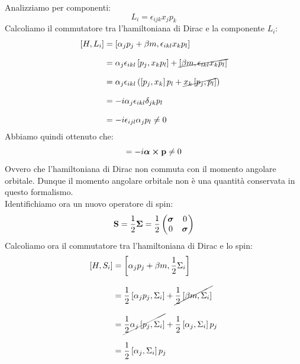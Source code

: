 Analizziamo per componenti:
\begin{equation}
  L_i = \epsilon_{ijk} x_j p_k
\end{equation}
Calcoliamo il commutatore tra l'hamiltoniana di Dirac e la componente $L_i$:
\begin{equation}
  \begin{split}
    [H, L_i] &= \left[\alpha_j p_j + \beta m, \epsilon_{ikl} x_k p_l \right] \\[8pt]
    &= \alpha_j \epsilon_{ikl} \left[p_j, x_k p_l\right] + \cancel{\left[\beta m, \epsilon_{ikl} x_k p_l\right]} \\[8pt]
    &= \alpha_j \epsilon_{ikl} \left(\left[p_j, x_k\right] p_l +\cancel{ x_k \left[p_j, p_l\right]}\right) \\[8pt]
    &= -i \alpha_j \epsilon_{ikl} \delta_{jk} p_l \\[8pt]
    &= -i \epsilon_{ijl} \alpha_j p_l \neq 0
  \end{split}
\end{equation}
Abbiamo quindi ottenuto che:
\begin{equation}
  [H, \vec{L}] = -i\vecsymb{\alpha} \cross \vec{p} \neq 0
\end{equation}
Ovvero che l'hamiltoniana di Dirac non commuta con il momento angolare orbitale. Dunque il momento angolare orbitale non è una quantità conservata in questo formalismo.\\
Identifichiamo ora un nuovo operatore di spin:
\begin{equation}
  \vb{S} = \dfrac{1}{2} \boldsymbol{\Sigma} = \dfrac{1}{2} \begin{pmatrix}
    \boldsymbol{\sigma} & 0 \\
    0 & \boldsymbol{\sigma}
  \end{pmatrix}
\end{equation}
Calcoliamo ora il commutatore tra l'hamiltoniana di Dirac e lo spin:
\begin{equation}
  \begin{split}
    [H, S_i] &= \left[\alpha_j p_j + \beta m, \dfrac{1}{2} \Sigma_i\right] \\[8pt]
    &= \dfrac{1}{2} \left[\alpha_j p_j, \Sigma_i\right] + \cancel{\dfrac{1}{2}\left[\beta m, \Sigma_i\right]} \\[8pt]
    &= \cancel{\dfrac{1}{2} \alpha_j \left[p_j, \Sigma_i\right]} + \dfrac{1}{2} \left[\alpha_j, \Sigma_i\right] p_j \\[8pt]
    &= \dfrac{1}{2} \left[\alpha_j, \Sigma_i\right] p_j
  \end{split}
\end{equation}
